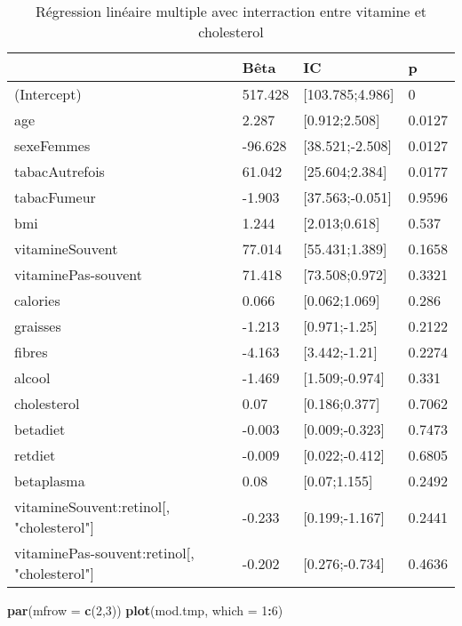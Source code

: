 \documentclass[]{article}
\newenvironment{Shaded}{\begin{snugshade}}{\end{snugshade}}
\newcommand{\KeywordTok}[1]{\textcolor[rgb]{0.13,0.29,0.53}{\textbf{#1}}}
\newcommand{\DataTypeTok}[1]{\textcolor[rgb]{0.13,0.29,0.53}{#1}}
\newcommand{\DecValTok}[1]{\textcolor[rgb]{0.00,0.00,0.81}{#1}}
\newcommand{\OperatorTok}[1]{\textcolor[rgb]{0.81,0.36,0.00}{\textbf{#1}}}
\newcommand{\NormalTok}[1]{#1}
\begin{document}
\begin{table}

\caption{\label{tab:unnamed-chunk-73}Régression linéaire multiple avec interraction entre vitamine et cholesterol}
\centering
\begin{tabular}[t]{l|l|l|l}
\hline
  & Bêta & IC & p\\
\hline
\rowcolor[HTML]{BBD2E1}  (Intercept) & 517.428 & [103.785;4.986] & 0\\
\hline
age & 2.287 & [0.912;2.508] & 0.0127\\
\hline
\rowcolor[HTML]{BBD2E1}  sexeFemmes & -96.628 & [38.521;-2.508] & 0.0127\\
\hline
tabacAutrefois & 61.042 & [25.604;2.384] & 0.0177\\
\hline
\rowcolor[HTML]{BBD2E1}  tabacFumeur & -1.903 & [37.563;-0.051] & 0.9596\\
\hline
bmi & 1.244 & [2.013;0.618] & 0.537\\
\hline
\rowcolor[HTML]{BBD2E1}  vitamineSouvent & 77.014 & [55.431;1.389] & 0.1658\\
\hline
vitaminePas-souvent & 71.418 & [73.508;0.972] & 0.3321\\
\hline
\rowcolor[HTML]{BBD2E1}  calories & 0.066 & [0.062;1.069] & 0.286\\
\hline
graisses & -1.213 & [0.971;-1.25] & 0.2122\\
\hline
\rowcolor[HTML]{BBD2E1}  fibres & -4.163 & [3.442;-1.21] & 0.2274\\
\hline
alcool & -1.469 & [1.509;-0.974] & 0.331\\
\hline
\rowcolor[HTML]{BBD2E1}  cholesterol & 0.07 & [0.186;0.377] & 0.7062\\
\hline
betadiet & -0.003 & [0.009;-0.323] & 0.7473\\
\hline
\rowcolor[HTML]{BBD2E1}  retdiet & -0.009 & [0.022;-0.412] & 0.6805\\
\hline
betaplasma & 0.08 & [0.07;1.155] & 0.2492\\
\hline
\rowcolor[HTML]{BBD2E1}  vitamineSouvent:retinol[, "cholesterol"] & -0.233 & [0.199;-1.167] & 0.2441\\
\hline
vitaminePas-souvent:retinol[, "cholesterol"] & -0.202 & [0.276;-0.734] & 0.4636\\
\hline
\end{tabular}
\end{table}

\begin{Shaded}
\begin{Highlighting}[]
\KeywordTok{par}\NormalTok{(}\DataTypeTok{mfrow =} \KeywordTok{c}\NormalTok{(}\DecValTok{2}\NormalTok{,}\DecValTok{3}\NormalTok{))}
\KeywordTok{plot}\NormalTok{(mod.tmp, }\DataTypeTok{which =} \DecValTok{1}\OperatorTok{:}\DecValTok{6}\NormalTok{)}
\end{Highlighting}
\end{Shaded}
\end{document}
